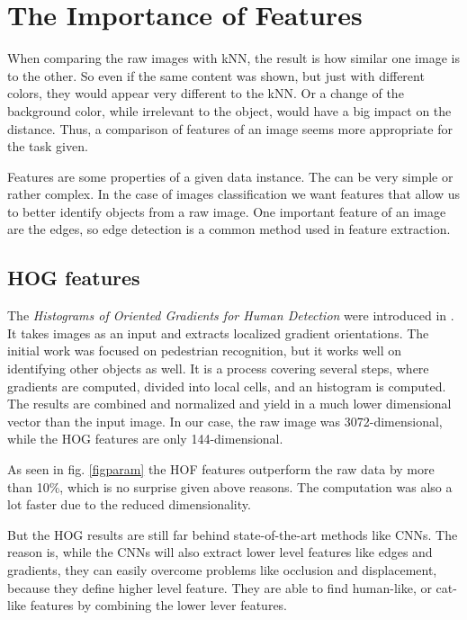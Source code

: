 \section{The Importance of Features} %

When comparing the raw images with kNN, the result is how similar one image is to the other. So even if the same content was shown, but just with different colors, they would appear very different to the kNN. Or a change of the background color, while irrelevant to the object, would have a big impact on the distance. Thus, a comparison of features of an image seems more appropriate for the task given. 

Features are some properties of a given data instance. The can be very simple or rather complex. In the case of images classification we want features that allow us to better identify objects from a raw image. One important feature of an image are the edges, so edge detection is a common method used in feature extraction. 

\subsection{HOG features}
The \emph{Histograms of Oriented Gradients for Human Detection} were introduced in  \cite{Dalal:2005:HOG:1068507.1069007}. It takes images as an input and extracts localized gradient orientations. The initial work was focused on pedestrian recognition, but it works well on identifying other objects as well. It is a process covering several steps, where gradients are computed, divided into local cells, and an histogram is computed. The results are combined and normalized and yield in a much lower dimensional vector than the input image. In our case, the raw image was 3072-dimensional, while the HOG features are only 144-dimensional. 

As seen in fig. \ref{figparam} the HOF features outperform the raw data by more than 10\%, which is no surprise given above reasons. The computation was also a lot faster due to the reduced dimensionality.

But the HOG results are still far behind state-of-the-art methods like CNNs. The reason is, while the CNNs will also extract lower level features like edges and gradients, they can easily overcome problems like occlusion and displacement, because they define higher level feature. They are able to find human-like, or cat-like features by combining the lower lever features. 

